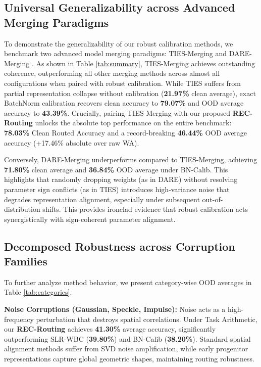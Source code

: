 \documentclass{article}
\theoremstyle{plain}
\theoremstyle{definition}
\theoremstyle{remark}
\begin{document}
\subsection{Universal Generalizability across Advanced Merging Paradigms}
To demonstrate the generalizability of our robust calibration methods, we benchmark two advanced model merging paradigms: TIES-Merging \cite{ilharco2023ties} and DARE-Merging \cite{yu2023dare}. As shown in Table \ref{tab:summary}, TIES-Merging achieves outstanding coherence, outperforming all other merging methods across almost all configurations when paired with robust calibration. While TIES suffers from partial representation collapse without calibration (\textbf{21.97\%} clean average), exact BatchNorm calibration recovers clean accuracy to \textbf{79.07\%} and OOD average accuracy to \textbf{43.39\%}. Crucially, pairing TIES-Merging with our proposed \textbf{REC-Routing} unlocks the absolute top performance on the entire benchmark: \textbf{78.03\%} Clean Routed Accuracy and a record-breaking \textbf{46.44\%} OOD average accuracy (+17.46\% absolute over raw WA).

Conversely, DARE-Merging underperforms compared to TIES-Merging, achieving \textbf{71.80\%} clean average and \textbf{36.84\%} OOD average under BN-Calib. This highlights that randomly dropping weights (as in DARE) without resolving parameter sign conflicts (as in TIES) introduces high-variance noise that degrades representation alignment, especially under subsequent out-of-distribution shifts. This provides ironclad evidence that robust calibration acts synergistically with sign-coherent parameter alignment.

\subsection{Decomposed Robustness across Corruption Families}
To further analyze method behavior, we present category-wise OOD averages in Table \ref{tab:categories}.

\textbf{Noise Corruptions (Gaussian, Speckle, Impulse):} Noise acts as a high-frequency perturbation that destroys spatial correlations. Under Task Arithmetic, our \textbf{REC-Routing} achieves \textbf{41.30\%} average accuracy, significantly outperforming SLR-WBC (\textbf{39.80\%}) and BN-Calib (\textbf{38.20\%}). Standard spatial alignment methods suffer from SVD noise amplification, while early progenitor representations capture global geometric shapes, maintaining routing robustness.
\end{document}
